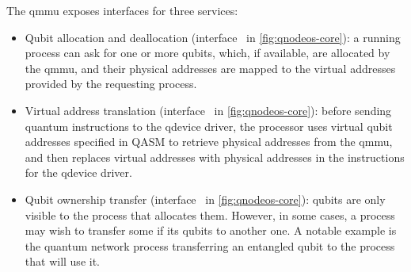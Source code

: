 The \acrshort{qmmu} exposes interfaces for three services:
\begin{itemize}
    \item Qubit allocation and deallocation (interface~ in \cref{fig:qnodeos-core}): a
          running process can ask for one or more qubits, which, if available, are allocated by the
          \acrshort{qmmu}, and their physical addresses are mapped to the virtual addresses provided
          by the requesting process.
    \item Virtual address translation (interface~ in \cref{fig:qnodeos-core}): before
          sending quantum instructions to the \acrshort{qdevice} driver, the processor uses virtual
          qubit addresses specified in QASM to retrieve physical addresses from the \acrshort{qmmu},
          and then replaces virtual addresses with physical addresses in the instructions for the
          \acrshort{qdevice} driver.
    \item Qubit ownership transfer (interface~ in \cref{fig:qnodeos-core}): qubits are
          only visible to the process that allocates them. However, in some cases, a process may
          wish to transfer some if its qubits to another one. A notable example is the quantum
          network process transferring an entangled qubit to the process that will use it.
\end{itemize}

\printbibliography[heading=subbibintoc,title={References}]
